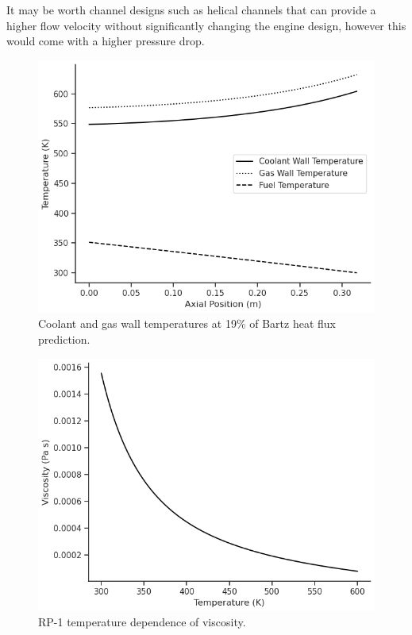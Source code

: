 \documentclass[11pt]{article}
\begin{document}
It may be worth channel designs such as helical channels that can provide a higher flow velocity without significantly changing the engine design, however this would come with a higher pressure drop.

\begin{figure}[H]
  \centering
  \includegraphics[width=0.8\linewidth]{Temperatures.png}
  \caption{Coolant and gas wall temperatures at 19\% of Bartz heat flux prediction.}
  \label{fig:temperatures}
\end{figure}

\begin{figure}[H]
  \centering
  \includegraphics[width=0.8\linewidth]{Viscosity.png}
  \caption{RP-1 temperature dependence of viscosity.}
  \label{fig:viscosity}
\end{figure}

\printbibliography
\end{document}
